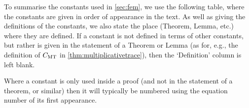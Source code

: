 To summarise the constants used in \cref{sec:fem}, we use the following table, where the constants are given in order of appearance in the text. As well as giving the definitions of the constants, we also state the place (Theorem, Lemma, etc.) where they are defined. If a constant is not defined in terms of other constants, but rather is given in the statement of a Theorem or Lemma (as for, e.g., the definition of $C_{\mathrm{MT}}$ in \cref{thm:multiplicativetrace}), then the `Definition' column is left blank.


Where a constant is only used inside a proof (and not in the statement of a theorem, or similar) then it will typically be numbered using the equation number of its first appearance.
